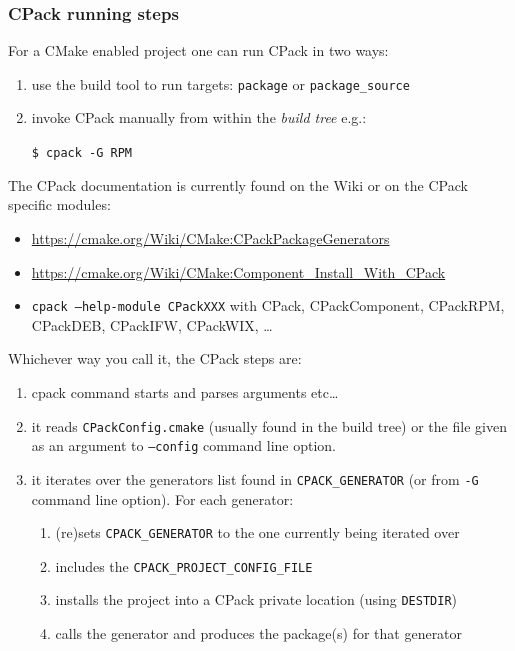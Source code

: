 \documentclass[compress,slidestop,table
              ]
               {beamer}
\newcommand{\fname}[1]{\texttt{#1}}
\begin{document}
\begin{frame}
\frametitle{CPack running steps}
For a CMake enabled project one can run CPack in two ways:
\begin{enumerate}
\item use the build tool to run targets: \fname{package} or \fname{package\_source}
\item invoke CPack manually from within the \emph{build tree} e.g.:

      \fname{\$ cpack -G RPM}
\end{enumerate}
The CPack documentation is currently found on the Wiki or
on the CPack specific modules:
\begin{itemize}
\item \url{https://cmake.org/Wiki/CMake:CPackPackageGenerators}
\item \url{https://cmake.org/Wiki/CMake:Component_Install_With_CPack}
\item \fname{cpack --help-module CPackXXX} with CPack, CPackComponent, CPackRPM, CPackDEB, CPackIFW, CPackWIX, \ldots
\end{itemize}

Whichever way you call it, the CPack steps are:
\begin{enumerate}
\item cpack command starts and parses arguments etc\ldots
\item it reads \fname{CPackConfig.cmake} (usually found in the build tree)
      or the file given as an argument to \fname{--config} command line option.
\item it iterates over the generators list found in \fname{CPACK\_GENERATOR}
      (or from \fname{-G} command line option). For each generator:
      \begin{enumerate}
      \item (re)sets \fname{CPACK\_GENERATOR} to the one currently being iterated over
      \item includes the \fname{CPACK\_PROJECT\_CONFIG\_FILE}
      \item installs the project into a CPack private location (using \fname{DESTDIR})
      \item calls the generator and produces the package(s) for that generator
      \end{enumerate}
\end{enumerate}


\end{frame}
\end{document}
